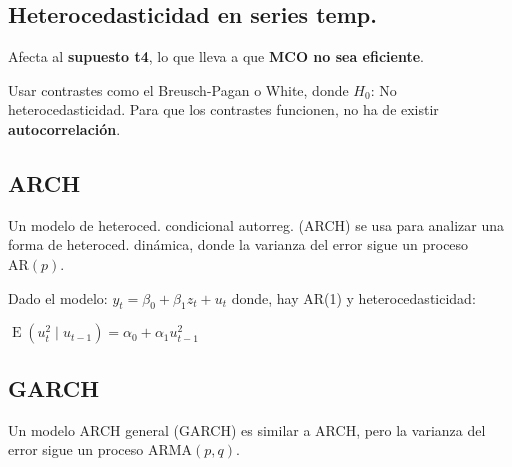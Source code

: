 \documentclass[10pt, a4paper, landscape]{article}
\DeclareMathOperator{\E}{E}
\begin{document}
\begin{multicols}{3}
\section*{Heterocedasticidad en series temp.}

Afecta al \textbf{supuesto t4}, lo que lleva a que \textbf{MCO no sea eficiente}.

Usar contrastes como el Breusch-Pagan o White, donde \( H_{0} \): No heterocedasticidad. Para que los contrastes funcionen, no ha de existir \textbf{autocorrelación}.

\subsection*{ARCH}

Un modelo de heteroced. condicional autorreg. (ARCH) se usa para analizar una forma de heteroced. dinámica, donde la varianza del error sigue un proceso \( \text{AR}(p) \).

Dado el modelo: \( y_{t} = \beta_{0} + \beta_{1} z_{t} + u_{t} \) donde, hay AR(1) y heterocedasticidad:

\begin{center}
	\( \E(u_{t}^{2} \mid u_{t - 1}) = \alpha_{0} + \alpha_{1} u_{t - 1}^{2} \)
\end{center}

\subsection*{GARCH}

Un modelo ARCH general (GARCH) es similar a ARCH, pero la varianza del error sigue un proceso \( \text{ARMA}(p, q) \).

\end{multicols}
\end{document}
